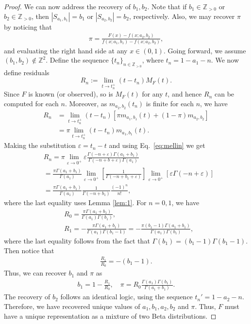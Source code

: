 \documentclass[lettersize,journal]{IEEEtran}
\newtheorem{proof}{Proof}
\begin{document}
\begin{proof}
We can now address the recovery of $b_1,b_2$. Note that if $b_1 \in\mathbb{Z}_{>0}$ or $b_2 \in \mathbb{Z}_{>0}$, then $|S_{a_1,b_1}| = b_1$ or $|S_{a_2,b_2}| = b_2$, respectively. Also, we may recover $\pi$ by noticing that
\begin{align*}
    \pi = \frac{F(x)-f(x;a_2,b_2)}{f(x;a_1,b_1)-f(x;a_2,b_2)},
\end{align*}
and evaluating the right hand side at any $x \in (0,1)$. Going forward, we assume $(b_1,b_2) \notin \mathbb{Z}^2$. Define the sequence $\{t_n\}_{n\in\mathbb{Z}_{>0}}$, where $t_n = 1-a_1-n$. We now define residuals
$$R_n :=\lim\limits_{t \to t_n^+} (t-t_n)M_F(t).$$
Since $F$ is known (or observed), so is $M_F(t)$ for any $t$, and hence $R_n$ can be computed for each $n$. Moreover, as $m_{a_2,b_2}(t_n)$ is finite for each $n$, we have
\begin{align*}
    R_n &= \lim\limits_{t \to t_n^+} (t-t_n)[\pi m_{a_1,b_1}(t)+(1-\pi)m_{a_2,b_2}]\\
    &= \pi\lim\limits_{t \to t_n^+} (t-t_n)m_{a_1,b_1}(t).
\end{align*}
Making the substitution $\varepsilon = t_n-t$ and using Eq.~\ref{eq:mellin} we get
\begin{align*}
    &R_n = \pi \lim\limits_{\varepsilon \to 0^+} \varepsilon\frac{\Gamma(-n+\varepsilon)\Gamma(a_1+b_1)}{\Gamma(-n+b+\varepsilon)\Gamma(a_1)}\\
    &= \frac{\pi \Gamma(a_1+b_1)}{\Gamma(a_1)}\lim\limits_{\varepsilon \to 0^+} \left[\frac{1}{\Gamma(-n+b_1+\varepsilon)}\right] \lim\limits_{\varepsilon\to 0^+} \left[\varepsilon \Gamma(-n+\varepsilon)\right]  \\
    &=\frac{\pi \Gamma(a_1+b_1)}{\Gamma(a_1)} \frac{1}{\Gamma(-n+b_1)} \frac{(-1)^n}{n!},
\end{align*}
where the last equality uses Lemma \ref{lem:1}. For $n=0,1$, we have
\begin{align*}
    &R_0 = \frac{\pi\Gamma(a_1+b_1)}{\Gamma(a_1)\Gamma(b_1)},\\
    &R_1 = -\frac{\pi \Gamma(a_1+b_1)}{\Gamma(a_1)\Gamma(b_1-1)} = -\frac{\pi(b_1-1)\Gamma(a_1+b_1)}{\Gamma(a_1)\Gamma(b_1)},
\end{align*}
where the last equality follows from the fact that $\Gamma(b_1)=(b_1-1)\Gamma(b_1-1)$. Then notice that
\begin{align*}
    \frac{R_1}{R_0}  = -(b_1-1).
\end{align*}
Thus, we can recover $b_1$ and $\pi$ as
\begin{align*}
    b_1 = 1-\frac{R_1}{R_0}, \quad \pi = R_0 \frac{\Gamma(a_1)\Gamma(b_1)}{\Gamma(a_1+b_1)}.
\end{align*}
The recovery of $b_2$ follows an identical logic, using the sequence $t_n'=1-a_2-n$. Therefore, we have recovered unique values of $a_1,b_1,a_2,b_2$ and $\pi$. Thus, $F$ must have a unique representation as a mixture of two Beta distributions.
\end{proof}
\end{document}

